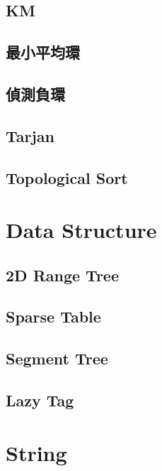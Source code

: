 \subsection{KM}

\subsection{最小平均環}

\subsection{偵測負環}

\subsection{Tarjan}

\subsection{Topological Sort}


\section{Data Structure}

\subsection{2D Range Tree}

\subsection{Sparse Table}

\subsection{Segment Tree}

\subsection{Lazy Tag}




\section{String}

